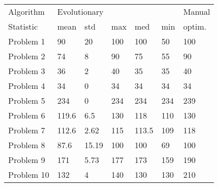 \begin{tabular}{lllllll}
\toprule
Algorithm & \multicolumn{5}{l}{Evolutionary} & Manual \\
Statistic &         mean &    std &  max &    med &  min & optim. \\
\midrule
Problem 1  &           90 &     20 &  100 &    100 &   50 &    100 \\
Problem 2  &           74 &      8 &   90 &     75 &   55 &     90 \\
Problem 3  &           36 &      2 &   40 &     35 &   35 &     40 \\
Problem 4  &           34 &      0 &   34 &     34 &   34 &     34 \\
Problem 5  &          234 &      0 &  234 &    234 &  234 &    239 \\
Problem 6  &        119.6 &    6.5 &  130 &    118 &  110 &    130 \\
Problem 7  &        112.6 &   2.62 &  115 &  113.5 &  109 &    118 \\
Problem 8  &         87.6 &  15.19 &  100 &    100 &   69 &    100 \\
Problem 9  &          171 &   5.73 &  177 &    173 &  159 &    190 \\
Problem 10 &          132 &      4 &  140 &    130 &  130 &    210 \\
\bottomrule
\end{tabular}
